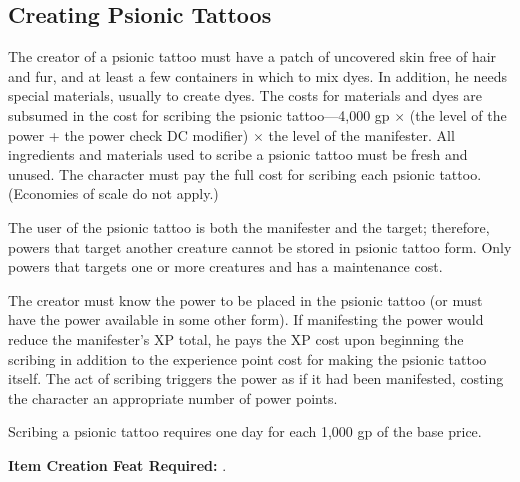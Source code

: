 \subsection{Creating Psionic Tattoos}
The creator of a psionic tattoo must have a patch of uncovered skin free of hair and fur, and at least a few containers in which to mix dyes. In addition, he needs special materials, usually to create dyes. The costs for materials and dyes are subsumed in the cost for scribing the psionic tattoo---4,000 gp $\times$ (the level of the power + the power check DC modifier) $\times$ the level of the manifester. All ingredients and materials used to scribe a psionic tattoo must be fresh and unused. The character must pay the full cost for scribing each psionic tattoo. (Economies of scale do not apply.)

The user of the psionic tattoo is both the manifester and the target; therefore, powers that target another creature cannot be stored in psionic tattoo form. Only powers that targets one or more creatures and has a maintenance cost.

The creator must know the power to be placed in the psionic tattoo (or must have the power available in some other form). If manifesting the power would reduce the manifester's XP total, he pays the XP cost upon beginning the scribing in addition to the experience point cost for making the psionic tattoo itself. The act of scribing triggers the power as if it had been manifested, costing the character an appropriate number of power points.

Scribing a psionic tattoo requires one day for each 1,000 gp of the base price.

\textbf{Item Creation Feat Required:} .

